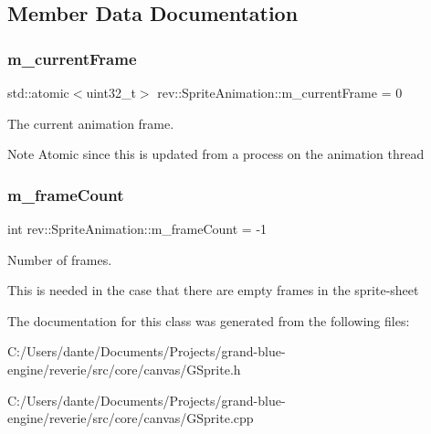 \subsection{Member Data Documentation}
\mbox{\label{classrev_1_1_sprite_animation_acd68f6c75c699ce245b51f5cf53d4e97}} 
\subsubsection{\texorpdfstring{m\_currentFrame}{m\_currentFrame}}
{\footnotesize\ttfamily std\+::atomic$<$uint32\+\_\+t$>$ rev\+::\+Sprite\+Animation\+::m\+\_\+current\+Frame = 0}



The current animation frame. 

\begin{DoxyNote}{Note}
Atomic since this is updated from a process on the animation thread 
\end{DoxyNote}
\mbox{\label{classrev_1_1_sprite_animation_a1f437cc80086b0edcde346cf899f8b6a}} 
\subsubsection{\texorpdfstring{m\_frameCount}{m\_frameCount}}
{\footnotesize\ttfamily int rev\+::\+Sprite\+Animation\+::m\+\_\+frame\+Count = -\/1}



Number of frames. 

This is needed in the case that there are empty frames in the sprite-\/sheet 

The documentation for this class was generated from the following files\+:\begin{DoxyCompactItemize}
\item 
C\+:/\+Users/dante/\+Documents/\+Projects/grand-\/blue-\/engine/reverie/src/core/canvas/G\+Sprite.\+h\item 
C\+:/\+Users/dante/\+Documents/\+Projects/grand-\/blue-\/engine/reverie/src/core/canvas/G\+Sprite.\+cpp\end{DoxyCompactItemize}

